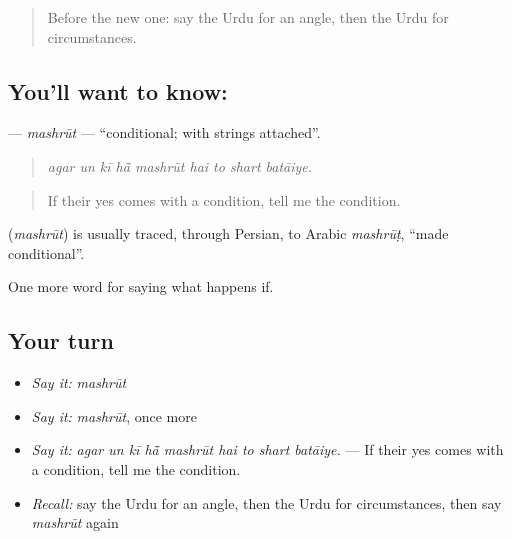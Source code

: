 \label{lesson:UR-C541-mashrut}



\begin{quote}
Before the new one: say the Urdu for an angle, then the Urdu for circumstances.
\end{quote}

\subsection*{You'll want to know: }
\textbf{} — \emph{mashrūt} — \textquotedblleft{}conditional; with strings attached\textquotedblright{}.

\begin{quote}
        
\end{quote}

\begin{quote}
\emph{agar un kī hā̃ mashrūt hai to shart batāiye.}
\end{quote}

\begin{quote}
If their yes comes with a condition, tell me the condition.
\end{quote}

\begin{cousinweb}
\textbf{} (\emph{mashrūt}) is usually traced, through Persian, to Arabic \emph{mashrūṭ}, \textquotedblleft{}made conditional\textquotedblright{}.
\end{cousinweb}

\begin{grammarlens}[title={What you've built}]
One more word for saying what happens if.
\end{grammarlens}

\subsection*{Your turn}
\begin{itemize}
\raggedright
  \item \emph{Say it:} \emph{mashrūt}
  \item \emph{Say it:} \emph{mashrūt}, once more
  \item \emph{Say it:} \emph{agar un kī hā̃ mashrūt hai to shart batāiye.} — If their yes comes with a condition, tell me the condition.
  \item \emph{Recall:} say the Urdu for an angle, then the Urdu for circumstances, then say \emph{mashrūt} again
\end{itemize}

